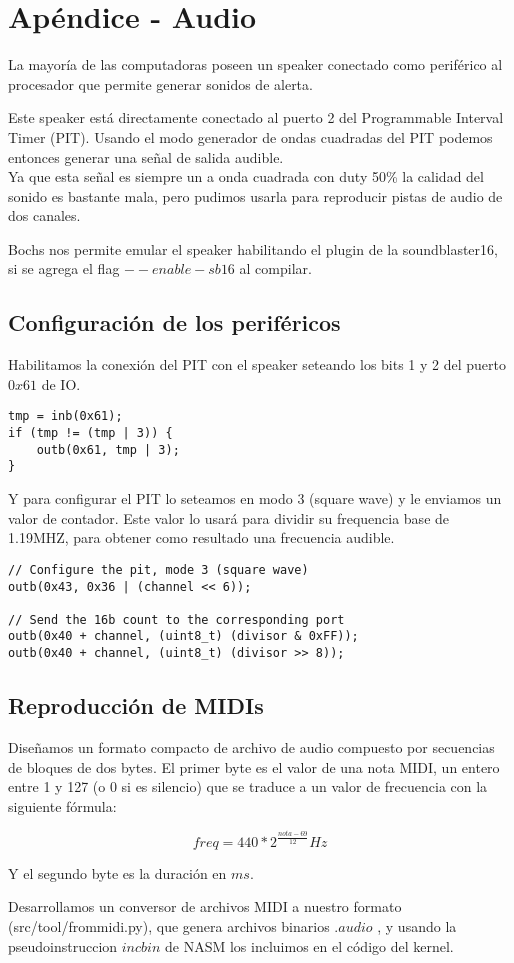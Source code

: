 \section{Apéndice - Audio}

La mayoría de las computadoras poseen un speaker conectado como periférico
al procesador que permite generar sonidos de alerta.

Este speaker está directamente conectado al puerto 2 del Programmable Interval Timer (PIT).
Usando el modo generador de ondas cuadradas del PIT podemos entonces generar una señal de salida audible. \\
Ya que esta señal es siempre un a onda cuadrada con duty 50\% la calidad del sonido es bastante mala,
pero pudimos usarla para reproducir pistas de audio de dos canales.

Bochs nos permite emular el speaker habilitando el plugin de la soundblaster16, si se agrega el flag $--enable-sb16$ al compilar.

\subsection{Configuración de los periféricos}

Habilitamos la conexión del PIT con el speaker seteando los bits 1 y 2 del puerto $0x61$ de IO.

\begin{lstlisting}
tmp = inb(0x61);
if (tmp != (tmp | 3)) {
    outb(0x61, tmp | 3);
}
\end{lstlisting}

Y para configurar el PIT lo seteamos en modo 3 (square wave) y le enviamos un valor de contador.
Este valor lo usará para dividir su frequencia base de 1.19MHZ, para obtener como resultado una frecuencia audible.

\begin{lstlisting}
// Configure the pit, mode 3 (square wave)
outb(0x43, 0x36 | (channel << 6));

// Send the 16b count to the corresponding port
outb(0x40 + channel, (uint8_t) (divisor & 0xFF));
outb(0x40 + channel, (uint8_t) (divisor >> 8));
\end{lstlisting}

\subsection{Reproducción de MIDIs}

Diseñamos un formato compacto de archivo de audio compuesto por secuencias de bloques de dos bytes.
El primer byte es el valor de una nota MIDI, un entero entre 1 y 127 (o 0 si es silencio) que se
traduce a un valor de frecuencia con la siguiente fórmula:

$$ freq = 440 * 2^{\frac{nota - 69}{12}} Hz $$

Y el segundo byte es la duración en $ms$.

Desarrollamos un conversor de archivos MIDI a nuestro formato (src/tool/frommidi.py),
que genera archivos binarios $.audio$ , y usando la pseudoinstruccion $incbin$ de NASM
los incluimos en el código del kernel.


